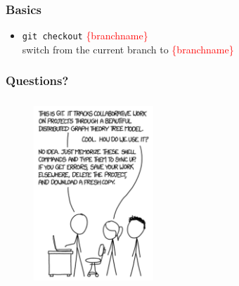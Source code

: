 \documentclass{beamer}
\begin{document}
\begin{frame}[fragile]
\frametitle{Basics}
\begin{itemize}
\item \verb!git checkout! \textcolor{red}{\{branchname\}} \\ 
switch from the current branch to \textcolor{red}{\{branchname\}}
\end{itemize}
\end{frame}

\begin{frame}[fragile]
\frametitle{Questions?}
\begin{figure}
\centering
\includegraphics[height=7cm, width=4.5cm]{questions}
\end{figure}
\end{frame}
\end{document}

